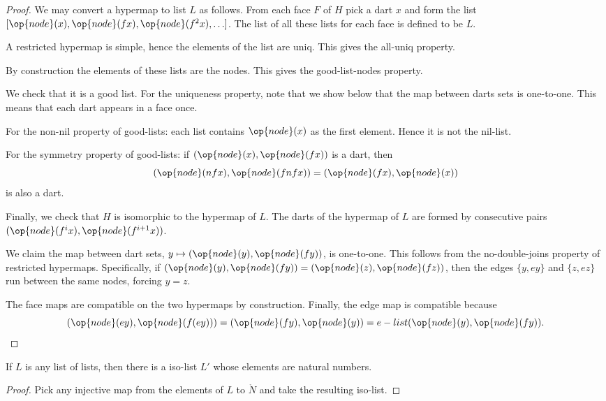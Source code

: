 \begin{proof} We may convert a hypermap to list $L$ as follows.  From each face $F$ of $H$
pick a dart $x$ and form the list $[\op{node}(x),\op{node}(f x),\op{node}(f^2 x),\ldots]$.  
The list of all these lists for each face is defined to be $L$.

A restricted hypermap is simple, hence the elements of the list are uniq.  This gives the all-uniq property.

By construction the elements of these lists are the nodes.  This gives the good-list-nodes property.

We check that it is a good list.  
For the uniqueness property, note that we show below that the map between darts sets is one-to-one.
This means that each dart appears in a face once.

For the non-nil property of good-lists: each list contains $\op{node}(x)$ as the first element. Hence it is
not the nil-list.

For the symmetry property of good-lists: if $(\op{node}(x),\op{node}(f x))$ is a dart, then
\[
(\op{node}(n f x),\op{node}(f n f x)) = (\op{node}(f x),\op{node}(x))
\]
is also a dart.

Finally, we check that $H$ is isomorphic to the hypermap of $L$.  The darts of the hypermap of $L$ are formed by
consecutive pairs $(\op{node}(f^i x),\op{node}(f^{i+1} x))$.  

We claim the map between dart sets, $y\mapsto (\op{node}(y),\op{node}(f y))$, is one-to-one.
This follows from the no-double-joins property of restricted hypermaps.  Specifically,
if $(\op{node}(y),\op{node}(f y)) = (\op{node}(z),\op{node}(f z))$, then the edges $\{y,e y\}$ and $\{z,ez\}$ run
between the same nodes, forcing $y=z$.

The face maps are compatible on the two hypermaps by construction. Finally, the edge map is compatible because
\[
(\op{node}(e y),\op{node}(f (e y))) = (\op{node}(f y),\op{node}(y)) = e-list (\op{node}(y),\op{node}(f y)).
\]
\end{proof}

\begin{lemma}  If $L$ is any list of lists, then there is a iso-list $L'$ whose elements are natural numbers.
\end{lemma}

\begin{proof} Pick any injective map from the elements of $L$ to $\ring{N}$ and take the resulting iso-list.
\end{proof}

